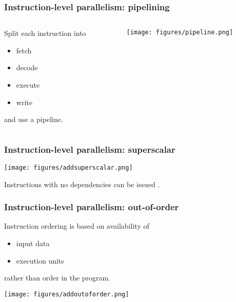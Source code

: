 \documentclass[dvipsnames,presentation,aspectratio=169,14pt]{beamer}
\begin{document}
\begin{frame}
  \frametitle{Instruction-level parallelism: pipelining}
  \vskip -20pt
  \begin{columns}
    \begin{column}{0.33\textwidth}\small
      Split each instruction into
      \begin{itemize}
      \item fetch
      \item decode
      \item execute
      \item write
      \end{itemize}
and use a pipeline.
    \end{column}
    \begin{column}{0.6\textwidth}
      \begin{center}
        \texttt{[image: figures/pipeline.png]}
      \end{center}
    \end{column}
  \end{columns}
\end{frame}

\begin{frame}
  \frametitle{Instruction-level parallelism: superscalar}
  \begin{center}
    \texttt{[image: figures/addsuperscalar.png]}
  \end{center}
  Instructions with no dependencies can be issued .
\end{frame}

\begin{frame}
  \frametitle{Instruction-level parallelism: out-of-order}
  Instruction ordering is based on availability of
  \vskip 5pt
  \begin{itemize}[itemsep=6pt]
  \item input data
  \item execution units
  \end{itemize}
  \vskip 5pt
  rather than order in the program.
  \hfill
  \begin{center}
    \texttt{[image: figures/addoutoforder.png]}
  \end{center}
\end{frame}
\end{document}
